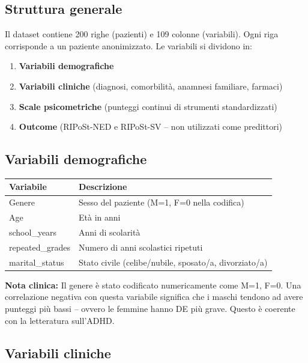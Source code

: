 \documentclass[12pt, a4paper]{article}
\newcommand{\nota}[1]{\vspace{0.4em}\noindent\colorbox{gray!15}{\parbox{\dimexpr\linewidth-2\fboxsep}{\small\textbf{Nota clinica:} #1}}\vspace{0.4em}}
\begin{document}
\subsection{Struttura generale}

Il dataset contiene 200 righe (pazienti) e 109 colonne (variabili). Ogni riga corrisponde a
un paziente anonimizzato. Le variabili si dividono in:

\begin{enumerate}
    \item \textbf{Variabili demografiche}
    \item \textbf{Variabili cliniche} (diagnosi, comorbilità, anamnesi familiare, farmaci)
    \item \textbf{Scale psicometriche} (punteggi continui di strumenti standardizzati)
    \item \textbf{Outcome} (RIPoSt-NED e RIPoSt-SV -- non utilizzati come predittori)
\end{enumerate}

\subsection{Variabili demografiche}

\begin{center}
\begin{tabular}{lp{9cm}}
\toprule
\textbf{Variabile} & \textbf{Descrizione} \\
\midrule
Genere & Sesso del paziente (M=1, F=0 nella codifica) \\
Age & Età in anni \\
school\_years & Anni di scolarità \\
repeated\_grades & Numero di anni scolastici ripetuti \\
marital\_status & Stato civile (celibe/nubile, sposato/a, divorziato/a) \\
\bottomrule
\end{tabular}
\end{center}

\nota{Il genere è stato codificato numericamente come M=1, F=0. Una correlazione negativa
con questa variabile significa che i maschi tendono ad avere punteggi più bassi -- ovvero le
femmine hanno DE più grave. Questo è coerente con la letteratura sull'ADHD.}

\subsection{Variabili cliniche}
\end{document}
